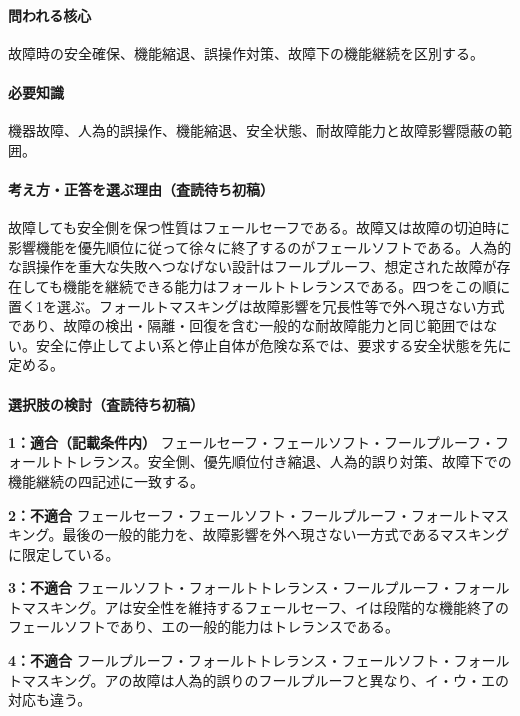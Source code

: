 \paragraph{問われる核心} 故障時の安全確保、機能縮退、誤操作対策、故障下の機能継続を区別する。

\paragraph{必要知識} 機器故障、人為的誤操作、機能縮退、安全状態、耐故障能力と故障影響隠蔽の範囲。

\paragraph{考え方・正答を選ぶ理由（査読待ち初稿）} 故障しても安全側を保つ性質はフェールセーフである。故障又は故障の切迫時に影響機能を優先順位に従って徐々に終了するのがフェールソフトである。人為的な誤操作を重大な失敗へつなげない設計はフールプルーフ、想定された故障が存在しても機能を継続できる能力はフォールトトレランスである。四つをこの順に置く1を選ぶ。フォールトマスキングは故障影響を冗長性等で外へ現さない方式であり、故障の検出・隔離・回復を含む一般的な耐故障能力と同じ範囲ではない。安全に停止してよい系と停止自体が危険な系では、要求する安全状態を先に定める。

\paragraph{選択肢の検討（査読待ち初稿）}\mbox{}\par

\noindent\textbf{1：適合（記載条件内）} フェールセーフ・フェールソフト・フールプルーフ・フォールトトレランス。安全側、優先順位付き縮退、人為的誤り対策、故障下での機能継続の四記述に一致する。\par

\noindent\textbf{2：不適合} フェールセーフ・フェールソフト・フールプルーフ・フォールトマスキング。最後の一般的能力を、故障影響を外へ現さない一方式であるマスキングに限定している。\par

\noindent\textbf{3：不適合} フェールソフト・フォールトトレランス・フールプルーフ・フォールトマスキング。アは安全性を維持するフェールセーフ、イは段階的な機能終了のフェールソフトであり、エの一般的能力はトレランスである。\par

\noindent\textbf{4：不適合} フールプルーフ・フォールトトレランス・フェールソフト・フォールトマスキング。アの故障は人為的誤りのフールプルーフと異なり、イ・ウ・エの対応も違う。\par

